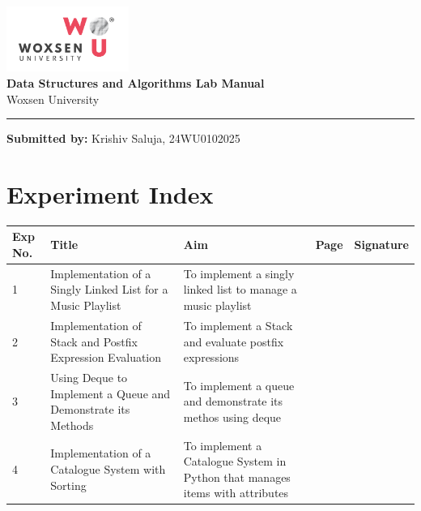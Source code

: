 \documentclass[a4paper,12pt]{article}
\begin{document}
\begin{titlepage}
    \centering
        \vspace*{2cm}
        \includegraphics[width=4cm]{woxsen_logo.png}\\[1cm]
        \Huge \textbf{Data Structures and Algorithms Lab Manual}\\[1cm]
        \Large Woxsen University\\[0.5cm]
\vspace*{\fill}
\noindent\rule{\textwidth}{1pt}
\vspace{0.5cm}
\begin{flushleft}
    \small \textbf{Submitted by:} Krishiv Saluja, 24WU0102025
\end{flushleft}
\end{titlepage}


\section*{Experiment Index}
\begin{tabular}{|p{1cm}|p{5cm}|p{5cm}|p{1cm}|p{2cm}|}
    \hline
    \textbf{Exp No.} & \textbf{Title} & \textbf{Aim} & \textbf{Page} & \textbf{Signature} \\
    \hline
    1 & Implementation of a Singly Linked List for a Music Playlist & To implement a singly linked list to manage a music playlist & \pageref{sec:exp1} & \\
    \hline
    2 & Implementation of Stack and Postfix Expression Evaluation & To implement a Stack and evaluate postfix expressions & \pageref{sec:exp2} & \\
    \hline
    3 & Using Deque to Implement a Queue and Demonstrate its Methods & To implement a queue and demonstrate its methos using deque & \pageref{sec:exp3} &\\
    \hline
    4 &Implementation of a Catalogue System with Sorting&To implement a Catalogue System in Python that manages items with attributes & \pageref{sec:exp4} &\\
    \hline
\end{tabular}
\clearpage

\end{document}
